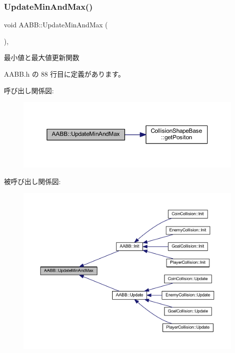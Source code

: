 \subsubsection{\texorpdfstring{Update\+Min\+And\+Max()}{UpdateMinAndMax()}}
{\footnotesize\ttfamily void A\+A\+B\+B\+::\+Update\+Min\+And\+Max (\begin{DoxyParamCaption}{ }\end{DoxyParamCaption})\hspace{0.3cm}{\ttfamily [inline]}, {\ttfamily [private]}}



最小値と最大値更新関数 



 A\+A\+B\+B.\+h の 88 行目に定義があります。

呼び出し関係図\+:\nopagebreak
\begin{figure}[H]
\begin{center}
\leavevmode
\includegraphics[width=350pt]{class_a_a_b_b_aad10f509f6726aed8285063a69df9085_cgraph}
\end{center}
\end{figure}
被呼び出し関係図\+:\nopagebreak
\begin{figure}[H]
\begin{center}
\leavevmode
\includegraphics[width=350pt]{class_a_a_b_b_aad10f509f6726aed8285063a69df9085_icgraph}
\end{center}
\end{figure}


